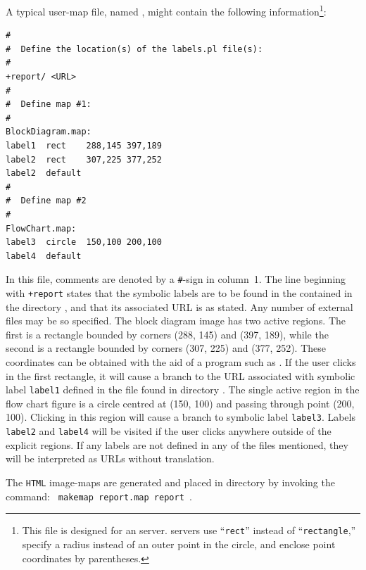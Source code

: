 \medskip\htmlrule[50\% center]
%
%
\html{\\}%
\noindent
A typical user-map file, named , 
might contain the following information\footnote{%
This file is designed for an  server.  
 servers use ``\texttt{rect}''
instead of ``\texttt{rectangle},'' 
specify a radius instead of an outer point in the circle, 
and enclose point coordinates by parentheses.}:
\begin{small}
\begin{verbatim}
#
#  Define the location(s) of the labels.pl file(s):
#
+report/ <URL>
#
#  Define map #1:
#
BlockDiagram.map:       
label1  rect    288,145 397,189
label2  rect    307,225 377,252
label2  default
#
#  Define map #2
#
FlowChart.map:
label3  circle  150,100 200,100
label4  default
\end{verbatim}
\end{small}
\html{\\}%
In this file, comments are denoted by a \texttt{\#}-sign in column~1.
The line beginning with \verb|+report| states that the symbolic labels
are to be found in the  contained in the directory
, and that its associated URL is as stated.  Any number
of external  files may be so specified.
The block diagram image has two active regions.  The first is a rectangle
bounded by corners (288, 145) and (397, 189), while the second is a rectangle
bounded by corners (307, 225) and (377, 252).  These coordinates
can be obtained with the aid of a program such as .
If the user clicks in the first rectangle, 
it will cause a branch to the URL associated
with symbolic label \texttt{label1} defined in the  file
found in directory .  The single active region in the
flow chart figure is a circle centred at (150, 100) and passing through
point (200, 100).  Clicking in this region will cause a branch to
symbolic label \texttt{label3}.  Labels \texttt{label2} and \texttt{label4}
will be visited if the user clicks anywhere outside of the explicit
regions.  If any labels are not defined in any of the 
files mentioned, they will be interpreted as URLs without translation.

The \texttt{HTML} image-maps are generated and placed in directory
 by invoking the command: \verb| makemap report.map report |.%

